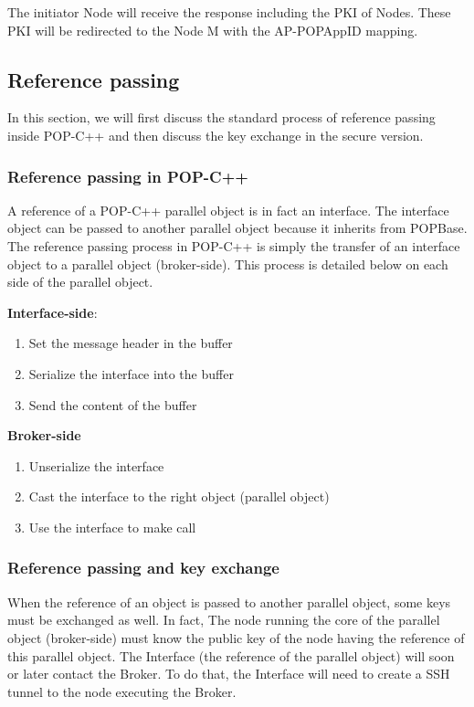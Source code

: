 The initiator Node will receive the response including the PKI of Nodes. These PKI will be redirected to the Node M with the AP-POPAppID mapping.


\subsection{Reference passing}
In this section, we will first discuss the standard process of reference passing inside POP-C++ and then discuss the key exchange in the secure version.

\subsubsection{Reference passing in POP-C++}
A reference of a POP-C++ parallel object is in fact an interface. The interface object can be passed to another parallel object because it inherits from POPBase. The reference passing process in POP-C++ is simply the transfer of an interface object to a parallel object (broker-side). This process is detailed below on each side of the parallel object.\s


\textbf{Interface-side}:
\begin{enumerate}
\item Set the message header in the buffer
\item Serialize the interface into the buffer
\item Send the content of the buffer
\end{enumerate}

\textbf{Broker-side}
\begin{enumerate}
\item Unserialize the interface
\item Cast the interface to the right object (parallel object)
\item Use the interface to make call
\end{enumerate}

\subsubsection{Reference passing and key exchange}

When the reference of an object is passed to another parallel object, some keys must be exchanged as well. In fact, The node running the core of the parallel object (broker-side) must know the public key of the node having the reference of this parallel object. The Interface (the reference of the parallel object) will soon or later contact the Broker. To do that, the Interface will need to create a SSH tunnel to the node executing the Broker.\s

